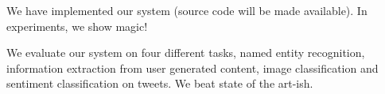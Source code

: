 We have implemented our system (source code will be made available).
In experiments, we show magic!

We evaluate our system on four different tasks, named entity recognition, information extraction from user generated content, image classification and sentiment classification on tweets.
We beat state of the art-ish.

% 
% 
% 
% 
% 
